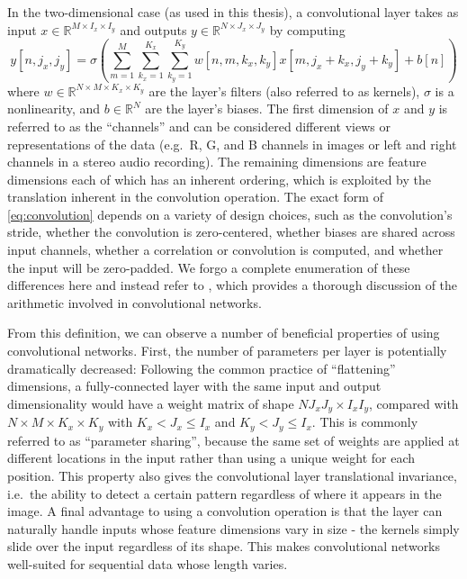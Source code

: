 In the two-dimensional case (as used in this thesis), a convolutional layer takes as input $x \in \mathbb{R}^{M \times I_x \times I_y}$ and outputs $y \in \mathbb{R}^{N \times J_x \times J_y}$ by computing
\begin{equation}
        y[n, j_x, j_y] = \sigma\left(\sum_{m = 1}^M \sum_{k_x = 1}^{K_x} \sum_{k_y = 1}^{K_y} w[n, m, k_x, k_y] x[m, j_x + k_x, j_y + k_y] + b[n]\right)
\label{eq:convolution}
\end{equation}
where $w \in \mathbb{R}^{N \times M \times K_x \times K_y}$ are the layer's filters (also referred to as kernels), $\sigma$ is a nonlinearity, and $b \in \mathbb{R}^N$ are the layer's biases.
The first dimension of $x$ and $y$ is referred to as the ``channels'' and can be considered different views or representations of the data (e.g.\ R, G, and B channels in images or left and right channels in a stereo audio recording).
The remaining dimensions are feature dimensions each of which has an inherent ordering, which is exploited by the translation inherent in the convolution operation.
The exact form of \cref{eq:convolution} depends on a variety of design choices, such as the convolution's stride, whether the convolution is zero-centered, whether biases are shared across input channels, whether a correlation or convolution is computed, and whether the input will be zero-padded.
We forgo a complete enumeration of these differences here and instead refer to \cite{}, which provides a thorough discussion of the arithmetic involved in convolutional networks.

From this definition, we can observe a number of beneficial properties of using convolutional networks.
First, the number of parameters per layer is potentially dramatically decreased: Following the common practice of ``flattening'' dimensions, a fully-connected layer with the same input and output dimensionality would have a weight matrix of shape $NJ_xJ_y \times I_xI_y$, compared with $N \times M \times K_x \times K_y$ with $K_x < J_x \le I_x$ and $K_y < J_y \le I_x$.
This is commonly referred to as ``parameter sharing'', because the same set of weights are applied at different locations in the input rather than using a unique weight for each position.
This property also gives the convolutional layer translational invariance, i.e.\ the ability to detect a certain pattern regardless of where it appears in the image.
A final advantage to using a convolution operation is that the layer can naturally handle inputs whose feature dimensions vary in size - the kernels simply slide over the input regardless of its shape.
This makes convolutional networks well-suited for sequential data whose length varies.

